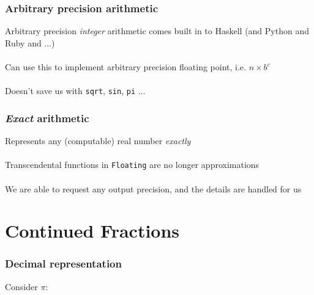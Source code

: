 \documentclass[11pt]{beamer}
\begin{document}
\begin{frame}
\frametitle{Arbitrary precision arithmetic}
Arbitrary precision \emph{integer} arithmetic comes built in to
Haskell (and Python and Ruby and ...)
\\~\\
Can use this to implement arbitrary precision floating point, i.e. $n
\times b^c$
\\~\\
Doesn't save us with \texttt{sqrt}, \texttt{sin}, \texttt{pi} ...
\end{frame}

\begin{frame}
\frametitle{\emph{Exact} arithmetic}
Represents any (computable) real number \emph{exactly}
\\~\\
Transcendental functions in \texttt{Floating} are no longer approximations
\\~\\
We are able to request any output precision, and the details are
handled for us
\end{frame}


\section{Continued Fractions}

\begin{frame}
\frametitle{Decimal representation}
Consider $\pi$:
\end{frame}
\end{document}

